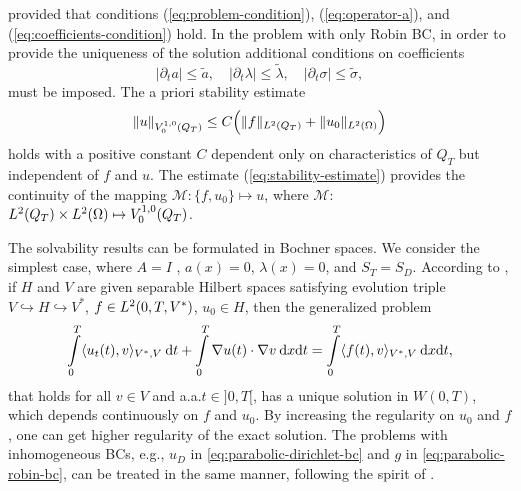 provided that conditions (\ref{eq:problem-condition}), 
(\ref{eq:operator-a}), and (\ref{eq:coefficients-condition}) hold. In the problem with 
only Robin BC, in order to provide the uniqueness of the solution additional conditions
on coefficients  
%
\begin{equation*}
|\partial_t a| \leq \widetilde{a}, \quad
|\partial_t \lambda| \leq \widetilde{\lambda}, \quad 
|\partial_t \sigma| \leq \widetilde{\sigma},
\end{equation*}
%
must be imposed. The a priori stability estimate 
%
\begin{equation}
\| u \|_{\VD{1, 0}{0} (Q_T)} 
\leq C \Big( \| f\|_{\L{2}(Q_T)} + \|u_0\|_{\L{2}(\Omega)} \Big)
\label{eq:stability-estimate}
\end{equation}
%
holds with a positive constant $C$ dependent only on characteristics of $Q_T$ but
independent of $f$ and $u$. The estimate
(\ref{eq:stability-estimate}) provides the continuity of the mapping 
$\mathcal{M}: \{f, u_0\} \mapsto u$, where $\mathcal{M}:$
$L^{2}(Q_T) \times L^{2}(\Omega)\mapsto {V}^{1, 0}_{0} (Q_T)$.

The solvability results can be formulated in Bochner spaces. We consider the 
simplest case, where $A = I$ , 
$a(x) = 0$, $\lambda(x) = 0$, and $S_T = S_D$. According to 
\cite{Wloka1987, Zeidler1990A}, if $H$ and $V$ are given separable Hilbert spaces
satisfying evolution triple 
$V \hookrightarrow H \hookrightarrow V^*$, $f \in L^{2}(0, T, V^*)$, 
$u_0 \in H$, then the generalized problem
%
\begin{equation*}
	\Int_{0}^{T} \langle u_t (t), v \rangle_{V^*, V} \dt + 
	\Int_{0}^{T} \nabla{u}(t) \cdot \nabla{v} \dxt = 
	\Int_{0}^{T} \langle f(t), v \rangle_{V^*, V} \dxt,
\end{equation*}
%
that holds for all $v \in V$ and a.a.$t \in ]0, T[$, 
has a unique solution in $W(0, T)$, which depends continuously on $f$ and $u_0$. 
By increasing the regularity on $u_0$ and $f$, one can get higher regularity of 
the exact solution. The 
problems with inhomogeneous BCs, e.g., $u_D$ in \eqref{eq:parabolic-dirichlet-bc} 
and $g$ in \eqref{eq:parabolic-robin-bc}, can be treated in the same manner, 
following the spirit of \cite{Wloka1987}.


